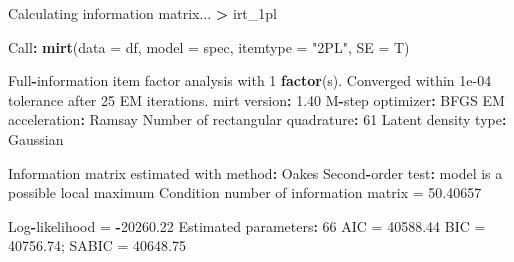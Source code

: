 \documentclass[
]{article}
\newenvironment{Shaded}{\begin{snugshade}}{\end{snugshade}}
\newcommand{\AttributeTok}[1]{\textcolor[rgb]{0.13,0.29,0.53}{#1}}
\newcommand{\DecValTok}[1]{\textcolor[rgb]{0.00,0.00,0.81}{#1}}
\newcommand{\FloatTok}[1]{\textcolor[rgb]{0.00,0.00,0.81}{#1}}
\newcommand{\FunctionTok}[1]{\textcolor[rgb]{0.13,0.29,0.53}{\textbf{#1}}}
\newcommand{\NormalTok}[1]{#1}
\newcommand{\OtherTok}[1]{\textcolor[rgb]{0.56,0.35,0.01}{#1}}
\newcommand{\SpecialCharTok}[1]{\textcolor[rgb]{0.81,0.36,0.00}{\textbf{#1}}}
\newcommand{\StringTok}[1]{\textcolor[rgb]{0.31,0.60,0.02}{#1}}
\begin{document}
\begin{Shaded}
\begin{Highlighting}[]
\NormalTok{Calculating information matrix...}
\SpecialCharTok{\textgreater{}}\NormalTok{ irt\_1pl}

\NormalTok{Call}\SpecialCharTok{:}
\FunctionTok{mirt}\NormalTok{(}\AttributeTok{data =}\NormalTok{ df, }\AttributeTok{model =}\NormalTok{ spec, }\AttributeTok{itemtype =} \StringTok{"2PL"}\NormalTok{, }\AttributeTok{SE =}\NormalTok{ T)}

\NormalTok{Full}\SpecialCharTok{{-}}\NormalTok{information item factor analysis with }\DecValTok{1} \FunctionTok{factor}\NormalTok{(s).}
\NormalTok{Converged within }\FloatTok{1e{-}04}\NormalTok{ tolerance after }\DecValTok{25}\NormalTok{ EM iterations.}
\NormalTok{mirt version}\SpecialCharTok{:} \FloatTok{1.40} 
\NormalTok{M}\SpecialCharTok{{-}}\NormalTok{step optimizer}\SpecialCharTok{:}\NormalTok{ BFGS }
\NormalTok{EM acceleration}\SpecialCharTok{:}\NormalTok{ Ramsay }
\NormalTok{Number of rectangular quadrature}\SpecialCharTok{:} \DecValTok{61}
\NormalTok{Latent density type}\SpecialCharTok{:}\NormalTok{ Gaussian }

\NormalTok{Information matrix estimated with method}\SpecialCharTok{:}\NormalTok{ Oakes}
\NormalTok{Second}\SpecialCharTok{{-}}\NormalTok{order test}\SpecialCharTok{:}\NormalTok{ model is a possible local maximum}
\NormalTok{Condition number of information matrix }\OtherTok{=}  \FloatTok{50.40657}

\NormalTok{Log}\SpecialCharTok{{-}}\NormalTok{likelihood }\OtherTok{=} \SpecialCharTok{{-}}\FloatTok{20260.22}
\NormalTok{Estimated parameters}\SpecialCharTok{:} \DecValTok{66} 
\NormalTok{AIC }\OtherTok{=} \FloatTok{40588.44}
\NormalTok{BIC }\OtherTok{=} \FloatTok{40756.74}\NormalTok{; SABIC }\OtherTok{=} \FloatTok{40648.75}
\end{Highlighting}
\end{Shaded}
\end{document}
